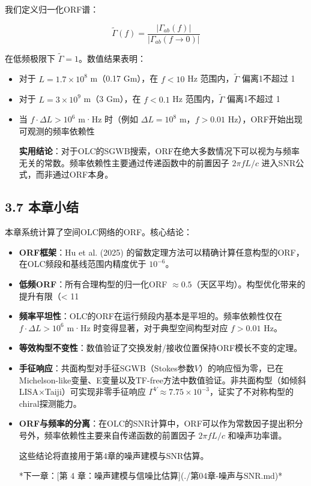 \documentclass[12pt,a4paper]{article}
\begin{document}
我们定义归一化ORF谱：

$$\tilde{\Gamma}(f) = \frac{|\Gamma_{ab}(f)|}{|\Gamma_{ab}(f \to 0)|}$$

在低频极限下 $\tilde{\Gamma} = 1$。数值结果表明：

\begin{itemize}
  \item 对于 $L = 1.7 \times 10^8$ m（0.17 Gm），在 $f < 10$ Hz 范围内，$\tilde{\Gamma}$ 偏离1不超过 1%
  \item 对于 $L = 3 \times 10^9$ m（3 Gm），在 $f < 0.1$ Hz 范围内，$\tilde{\Gamma}$ 偏离1不超过 1%
  \item 当 $f \cdot \Delta L > 10^6$ m·Hz 时（例如 $\Delta L = 10^8$ m，$f > 0.01$ Hz），ORF开始出现可观测的频率依赖性

\textbf{实用结论}：对于OLC的SGWB搜索，ORF在绝大多数情况下可以视为与频率无关的常数。频率依赖性主要通过传递函数中的前置因子 $2\pi f L/c$ 进入SNR公式，而非通过ORF本身。

\end{itemize}
\subsection{3.7 本章小结}


本章系统计算了空间OLC网络的ORF。核心结论：

\begin{itemize}
  \item[1] \textbf{ORF框架}：Hu et al. (2025) 的留数定理方法可以精确计算任意构型的ORF，在OLC频段和基线范围内精度优于 $10^{-6}$。

  \item[2] \textbf{低频ORF}：所有合理构型的归一化ORF $\approx 0.5$（天区平均）。构型优化带来的提升有限（< 11%

  \item[3] \textbf{频率平坦性}：OLC的ORF在运行频段内基本是平坦的。频率依赖性仅在 $f \cdot \Delta L > 10^6$ m·Hz 时变得显著，对于典型空间构型对应 $f > 0.01$ Hz。

  \item[4] \textbf{等效构型不变性}：数值验证了交换发射/接收位置保持ORF模长不变的定理。

  \item[5] \textbf{手征响应}：共面构型对手征SGWB（Stokes参数$V$）的响应恒为零，已在Michelson-like变量、E变量以及TF-free方法中数值验证。非共面构型（如倾斜LISA×Taiji）可实现非零手征响应 $\Gamma^V \approx 7.75\times 10^{-3}$，证实了不对称构型的chiral探测能力。

  \item[6] \textbf{ORF与频率的分离}：在OLC的SNR计算中，ORF可以作为常数因子提出积分号外，频率依赖性主要来自传递函数的前置因子 $2\pi f L/c$ 和噪声功率谱。

这些结论将直接用于第4章的噪声建模与SNR估算。


*下一章：[第 4 章：噪声建模与信噪比估算](./第04章-噪声与SNR.md)*

\end{itemize}
\end{document}
